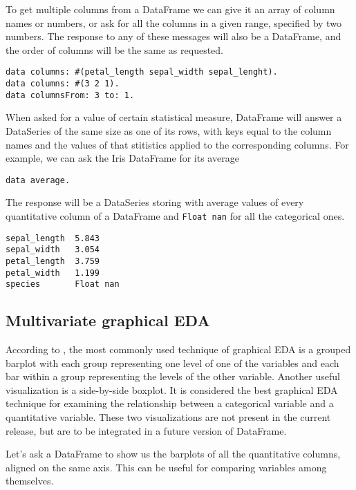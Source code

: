 \documentclass[sigplan]{acmart}
\begin{document}
To get multiple columns from a DataFrame we can give it an array of column names or numbers, or ask for all the columns in a given range, specified by two numbers. The response to any of these messages will also be a DataFrame, and the order of columns will be the same as requested.

\begin{lstlisting}[basicstyle=\small,language=Smalltalk]
data columns: #(petal_length sepal_width sepal_lenght).
data columns: #(3 2 1).
data columnsFrom: 3 to: 1.
\end{lstlisting}

When asked for a value of certain statistical measure, DataFrame will answer a DataSeries of the same size as one of its rows, with keys equal to the column names and the values of that stitistics applied to the corresponding columns. For example, we can ask the Iris DataFrame for its average

\begin{lstlisting}[basicstyle=\small,language=Smalltalk]
data average.
\end{lstlisting}

The response will be a DataSeries storing with average values of every quantitative column of a DataFrame and \texttt{Float nan} for all the categorical ones.

\begin{lstlisting}[basicstyle=\small,language=Smalltalk]
sepal_length  5.843
sepal_width   3.054
petal_length  3.759
petal_width   1.199
species       Float nan
\end{lstlisting}

\subsection{Multivariate graphical EDA}
\label{sec:multi-graph}

According to \cite{Seltman}, the most commonly used technique of graphical EDA is a grouped barplot with each group representing one level of one of the variables and each bar within a group representing the levels of the other variable. Another useful visualization is a side-by-side boxplot. It is considered the best graphical EDA technique for examining the relationship between a categorical variable and a quantitative variable. These two visualizations are not present in the current release, but are to be integrated in a future version of DataFrame.

Let's ask a DataFrame to show us the barplots of all the quantitative columns, aligned on the same axis. This can be useful for comparing variables among themselves.
\end{document}
